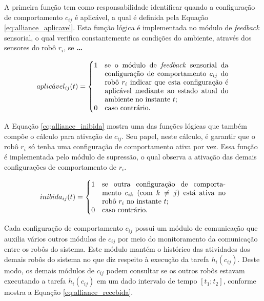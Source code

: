         A primeira função tem como responsabilidade identificar quando a configuração de comportamento $c_{ij}$ é aplicável, a qual é definida pela Equação \ref{eq:alliance_aplicavel}. Esta função lógica é implementada no módulo de \textit{feedback} sensorial, o qual verifica constantemente as condições do ambiente, através dos sensores do robô $r_i$, se \textbf{\color{red}\dots}
        
        \begin{equation} \label{eq:alliance_aplicavel}
            aplic\acute{a}vel_{ij}(t) =
            \begin{cases}
                1 & \parbox[t]{.5\textwidth}{se o módulo de \textit{feedback} sensorial da configuração de comportamento $c_{ij}$ do robô $r_i$ indicar que esta configuração é aplicável mediante ao estado atual do ambiente no instante $t$;} \\
                0 & \text{caso contrário.}
            \end{cases}
        \end{equation}
        
        A Equação \ref{eq:alliance_inibida} mostra uma das funções lógicas que também compõe o cálculo para ativação de $c_{ij}$. Seu papel, neste cálculo, é garantir que o robô $r_i$ só tenha uma configuração de comportamento ativa por vez. Essa função é implementada pelo módulo de supressão, o qual observa a ativação das demais configurações de comportamento de $r_i$. 
        
        \begin{equation} \label{eq:alliance_inibida}
            inibida_{ij}(t) =
            \begin{cases}
                1 & \parbox[t]{.5\textwidth}{se outra configuração de comportamento $c_{ik}$ (com $k \neq j$) está ativa no robô $r_i$ no instante $t$;} \\
                0 & \text{caso contrário.}
            \end{cases}
        \end{equation}
        
        Cada configuração de comportamento $c_{ij}$ possui um módulo de comunicação que auxilia vários outros módulos de $c_{ij}$ por meio do monitoramento da comunicação entre os robôs do sistema. Este módulo mantém o histórico das atividades dos demais robôs do sistema no que diz respeito à execução da tarefa $h_i(c_{ij})$. Deste modo, os demais módulos de $c_{ij}$ podem consultar se os outros robôs estavam executando a tarefa $h_i(c_{ij})$ em um dado intervalo de tempo $[t_1; t_2]$, conforme mostra a Equação \ref{eq:alliance_recebida}.
        
